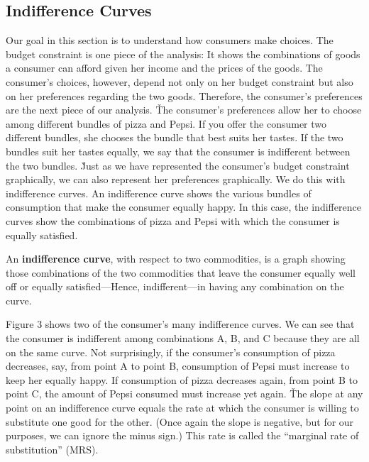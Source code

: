 
\subsection{Indifference Curves}

Our goal in this section is to understand how consumers make choices. The budget constraint is one piece of the
analysis: It shows the combinations of goods a consumer can afford given her income and the prices of the goods. The
consumer's choices, however, depend not only on her budget constraint but also on her preferences regarding the two
goods. Therefore, the consumer's preferences are the next piece of our analysis. \v

The consumer's preferences allow her to choose among different bundles of pizza and Pepsi. If you offer the consumer
two different bundles, she chooses the bundle that best suits her tastes. If the two bundles suit her tastes equally,
we say that the consumer is indifferent between the two bundles. \v

Just as we have represented the consumer's budget constraint graphically, we can also represent her preferences
graphically. We do this with indifference curves. An indifference curve shows the various bundles of consumption that
make the consumer equally happy. In this case, the indifference curves show the combinations of pizza and Pepsi with
which the consumer is equally satisfied.

An \textbf{indifference curve}, with respect to two commodities, is a graph showing those combinations of the two
commodities that leave the consumer equally well off or equally satisfied—Hence, indifferent—in having any combination
on the curve.
\ed

Figure 3 shows two of the consumer's many indifference curves. We can see that the consumer is indifferent among
combinations A, B, and C because they are all on the same curve. Not surprisingly, if the consumer's consumption of
pizza decreases, say, from point A to point B, consumption of Pepsi must increase to keep her equally happy. If
consumption of pizza decreases again, from point B to point C, the amount of Pepsi consumed must increase yet again. \v

The slope at any point on an indifference curve equals the rate at which the consumer is willing to substitute one
good for the other. (Once again the slope is negative, but for our purposes, we can ignore the minus sign.) This rate
is called the ``marginal rate of substitution'' (MRS).

